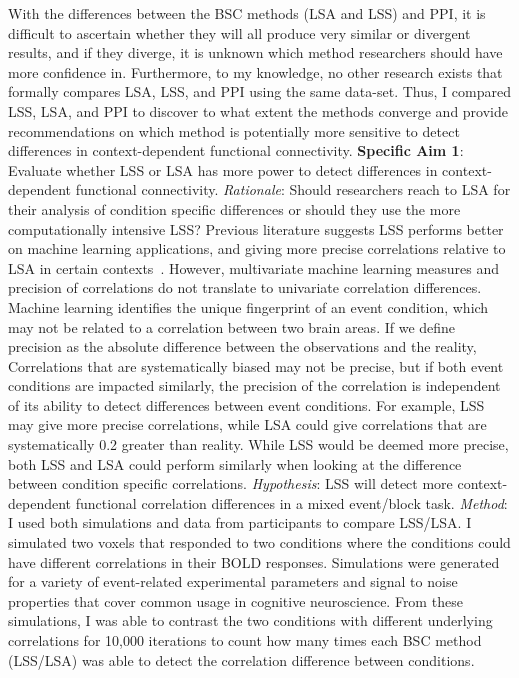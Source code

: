 \documentclass[phd,appendix,figures]{uithesis}
\begin{document}
With the differences between the BSC methods (LSA and LSS) and PPI, it is difficult to ascertain whether
they will all produce very similar or divergent results, and if they 
diverge, it is unknown which method researchers should have more confidence in.
Furthermore, to my knowledge, no other research exists that formally compares
LSA, LSS, and PPI using the same data-set.
Thus, I compared LSS, LSA, and PPI to discover to what extent the methods converge and provide
recommendations on which method is potentially more sensitive to detect
differences in context-dependent functional connectivity.
\newline
\newline
\textbf{Specific Aim 1}: Evaluate whether LSS or LSA has more power to detect
differences in context-dependent functional connectivity.
\newline
\newline
\textit{Rationale}: Should researchers reach to LSA for their analysis of condition specific differences
or should they use the more computationally intensive LSS?
Previous literature suggests LSS performs better on machine learning applications, and giving
more precise correlations relative to LSA in certain contexts~\cite{Abdulrahman2016,Mumford2012,Turner2012a,Cisler2012}.
However, multivariate machine learning measures and precision of correlations do not translate to
univariate correlation differences.
Machine learning identifies the unique fingerprint of an event condition, which may not be related
to a correlation between two brain areas.
If we define precision as the absolute difference between the observations and the reality,
Correlations that are systematically biased may not be precise, but if both event conditions are
impacted similarly, the precision of the correlation is independent of its ability to
detect differences between event conditions.
For example, LSS may give more precise correlations, while LSA could give
correlations that are systematically 0.2 greater than reality.
While LSS would be deemed more precise, both LSS and LSA could perform similarly
when looking at the difference between condition specific correlations.
\newline
\newline
\textit{Hypothesis}:
LSS will detect more context-dependent functional correlation differences in a mixed event/block task.
\newline
\newline
\textit{Method}:
I used both simulations and data from participants to compare LSS/LSA.
I simulated two voxels that responded to two conditions where the conditions
could have different correlations in their BOLD responses.
Simulations were generated for a variety of event-related experimental parameters and
signal to noise properties that cover common usage in cognitive neuroscience.
From these simulations, I was able to contrast the two conditions with different
underlying correlations for 10,000  iterations to count how many times
each BSC method (LSS/LSA) was able to detect the correlation difference between conditions.
\end{document}
